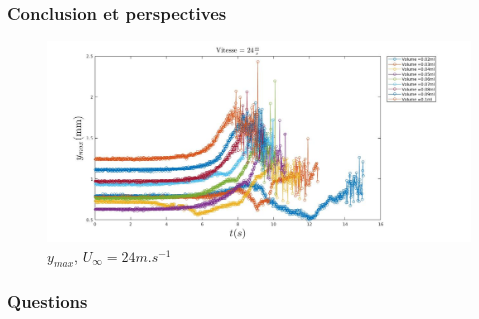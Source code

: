 \documentclass{beamer}
\begin{document}
\begin{frame}
\frametitle{Conclusion et perspectives}
\begin{figure}[!ht]
        \centering
	\includegraphics[width = 0.9\linewidth]{./image/v=24ym.jpg}
	\caption{$y_{max}$, $U_{\infty}=24m.s^{-1}$}
\end{figure}
\end{frame}

\begin{frame}
\frametitle{Questions}
\end{frame}
\end{document}
